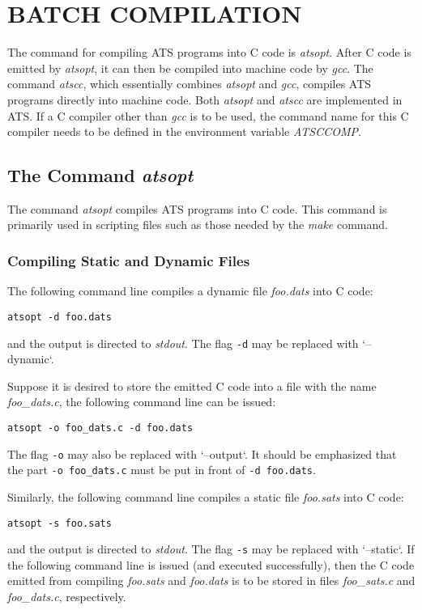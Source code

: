 \chapter{BATCH COMPILATION}\label{chapter:batch_compilation}

The command for compiling ATS programs into C code is {\it atsopt}.  After
C code is emitted by {\it atsopt}, it can then be compiled into machine
code by {\it gcc}. The command {\it atscc}, which essentially combines {\it
atsopt} and {\it gcc}, compiles ATS programs directly into machine code.
Both {\it atsopt} and {\it atscc} are implemented in ATS. If a
C compiler other than {\it gcc} is to be used, the command name for
this C compiler needs to be defined in the environment variable
{\it ATSCCOMP}.

\section{The Command {\it atsopt}}
The command {\it atsopt} compiles ATS programs into C code.  This command
is primarily used in scripting files such as those needed by the {\it make}
command.

\subsection{Compiling Static and Dynamic Files}
The following command line compiles a dynamic file {\it foo.dats} into C
code:
\begin{verbatim}
atsopt -d foo.dats
\end{verbatim}
and the output is directed to {\it stdout}.  The flag \verb`-d` may be
replaced with `--dynamic`.

Suppose it is desired to store the emitted C code into a file with the name
{\it foo\_dats.c}, the following command line can be issued:
\begin{verbatim}
atsopt -o foo_dats.c -d foo.dats
\end{verbatim}
The flag \verb`-o` may also be replaced with `--output`.
It should be emphasized that the part
\verb`-o foo_dats.c` must be put in front of \verb`-d foo.dats`.

Similarly, the following command line compiles a static file {\it foo.sats}
into C code:
\begin{verbatim}
atsopt -s foo.sats
\end{verbatim}
and the output is directed to {\it stdout}.  The flag \verb`-s` may be
replaced with `--static`. If the following command line is issued (and
executed successfully), then the C code emitted from compiling {\it
foo.sats} and {\it foo.dats} is to be stored in files {\it foo\_sats.c} and
{\it foo\_dats.c}, respectively.

